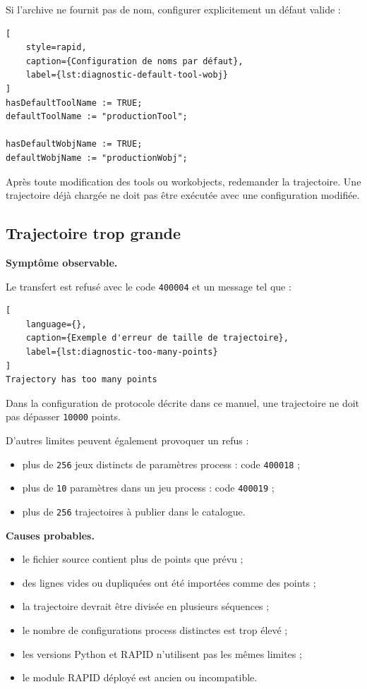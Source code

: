 \documentclass{rapportENSAM}
\begin{document}
Si l'archive ne fournit pas de nom, configurer explicitement un défaut valide :

\begin{lstlisting}[
    style=rapid,
    caption={Configuration de noms par défaut},
    label={lst:diagnostic-default-tool-wobj}
]
hasDefaultToolName := TRUE;
defaultToolName := "productionTool";

hasDefaultWobjName := TRUE;
defaultWobjName := "productionWobj";
\end{lstlisting}

Après toute modification des tools ou workobjects, redemander la trajectoire.
Une trajectoire déjà chargée ne doit pas être exécutée avec une configuration
modifiée.


\subsection{Trajectoire trop grande}
\label{subsec:diagnostic-trajectory-too-large}

\textbf{Symptôme observable.}

Le transfert est refusé avec le code \texttt{400004} et un message tel que :

\begin{lstlisting}[
    language={},
    caption={Exemple d'erreur de taille de trajectoire},
    label={lst:diagnostic-too-many-points}
]
Trajectory has too many points
\end{lstlisting}

Dans la configuration de protocole décrite dans ce manuel, une trajectoire ne
doit pas dépasser \texttt{10000} points.

D'autres limites peuvent également provoquer un refus :

\begin{itemize}
    \item plus de \texttt{256} jeux distincts de paramètres process :
    code \texttt{400018} ;
    \item plus de \texttt{10} paramètres dans un jeu process :
    code \texttt{400019} ;
    \item plus de \texttt{256} trajectoires à publier dans le catalogue.
\end{itemize}

\textbf{Causes probables.}

\begin{itemize}
    \item le fichier source contient plus de points que prévu ;
    \item des lignes vides ou dupliquées ont été importées comme des points ;
    \item la trajectoire devrait être divisée en plusieurs séquences ;
    \item le nombre de configurations process distinctes est trop élevé ;
    \item les versions Python et RAPID n'utilisent pas les mêmes limites ;
    \item le module RAPID déployé est ancien ou incompatible.
\end{itemize}
\end{document}
